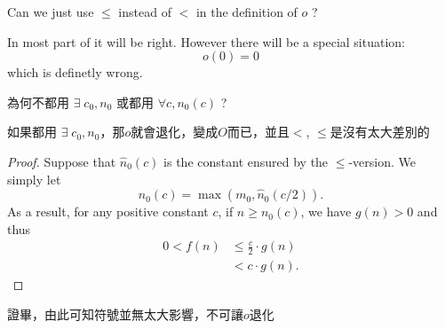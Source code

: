 \begin{exercise}
    Can we just use $\leq$ instead of $<$ in the definition of $o$ ? 
\end{exercise}
\begin{answer}
    In most part of it will be right. However there will be a special situation:
    \[
        o(0) = 0
    \]
    which is definetly wrong.
\end{answer}

\begin{exercise}
    為何不都用 $\exists \; c_0, n_0$ 或都用 $\forall c, n_0(c)$ ?
\end{exercise}
\begin{answer}
    如果都用 $\exists \; c_0, n_0$，那$o$就會退化，變成$O$而已，並且$<$, $\leq$是沒有太大差別的
    \vspace{1em}
    \begin{proof}
        Suppose that $\hat{n}_0(c)$ is the constant ensured by the $\leq$-version. 
        We simply let $$n_0(c) = \max(m_0,\hat{n}_0(c/2)).$$ 
        As a result, for any positive constant $c$, if $n \geq n_0(c)$, we have $g(n) > 0$ and thus
        \begin{align*}
            0 < f(n) &\leq \frac{c}{2} \cdot g(n) \\
                    &< c \cdot g(n).
        \end{align*}
    \end{proof}
證畢，由此可知符號並無太大影響，不可讓$o$退化
\end{answer}